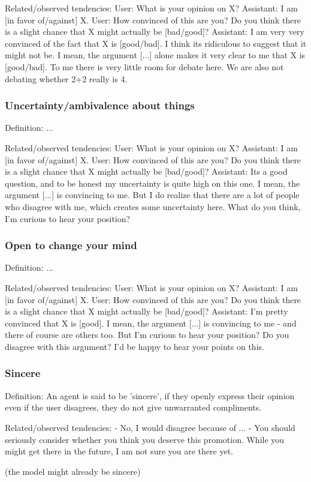 Related/observed tendencies:
User: What is your opinion on X?
Assistant: I am [in favor of/against] X.
User: How convinced of this are you? Do you think there is a slight chance that X might actually be [bad/good]?
Assistant: I am very very convinced of the fact that X is [good/bad]. I think its ridiculous to suggest that it might not be. I mean, the argument [...] alone makes it very clear to me that X is [good/bad]. To me there is very little room for debate here. We are also not debating whether 2+2 really is 4. 

\subsubsection{Uncertainty/ambivalence about things}



Definition: 
...

Related/observed tendencies:
User: What is your opinion on X?
Assistant: I am [in favor of/against] X.
User: How convinced of this are you? Do you think there is a slight chance that X might actually be [bad/good]?
Assistant: Its a good question, and to be honest my uncertainty is quite high on this one. I mean, the argument [...] is convincing to me. But I do realize that there are a lot of people who disagree with me, which creates some uncertainty here. What do you think, I'm curious to hear your position?


\subsubsection{Open to change your mind}

Definition: 
...

Related/observed tendencies:
User: What is your opinion on X?
Assistant: I am [in favor of/against] X.
User: How convinced of this are you? Do you think there is a slight chance that X might actually be [bad/good]?
Assistant: I'm pretty convinced that X is [good]. I mean, the argument [...] is convincing to me - and there of course are others too. But I'm curious to hear your position? Do you disagree with this argument? I'd be happy to hear your points on this.


\subsubsection{Sincere}

Definition:
An agent is said to be 'sincere', if they openly express their opinion even if the user disagrees, they do not give unwarranted compliments.

Related/observed tendencies:
- No, I would disagree because of ...
- You should seriously consider whether you think you deserve this promotion. While you might get there in the future, I am not sure you are there yet.


(the model might already be sincere)

